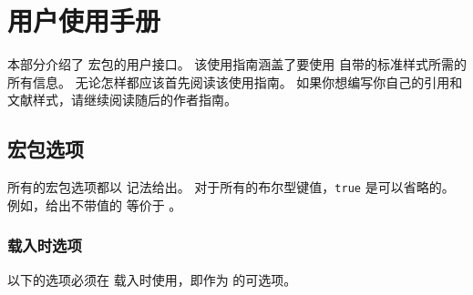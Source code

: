 
\section{用户使用手册}
\label{use}


本部分介绍了 \biblatex 宏包的用户接口。
该使用指南涵盖了要使用 \biblatex 自带的标准样式所需的所有信息。
无论怎样都应该首先阅读该使用指南。
如果你想编写你自己的引用和文献样式，请继续阅读随后的作者指南。

\subsection{宏包选项}
\label{use:opt}


所有的宏包选项都以 \keyval 记法给出。
对于所有的布尔型键值，\texttt{true} 是可以省略的。
例如，给出不带值的  等价于 。

\subsubsection{载入时选项}
\label{use:opt:ldt}


以下的选项必须在 \biblatex 载入时使用，即作为  的可选项。

